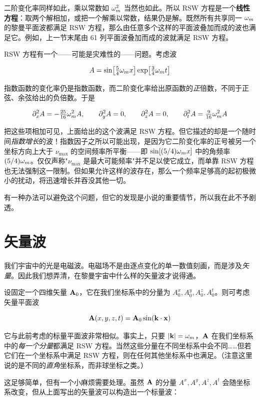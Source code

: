 二阶变化率同样如此，乘以常数如 $\omega_m^{2}$ 当然也如此。所以 RSW 方程是一个\textbf{线性方程}：取两个解相加，或把一个解乘以常数，结果仍是解。既然所有共享同一 $\omega_m$ 的黎曼平面波都满足 RSW 方程，那么由任意多个这样的平面波叠加而成的波也满足它。例如，上一节末尾由 61 列平面波叠加而成的波就满足 RSW 方程。

RSW 方程有一个——可能是灾难性的——问题。考虑波

\[
A=\sin\!\left[\tfrac{5}{4}\omega_m x\right]\exp\!\left[\tfrac{3}{4}\omega_m t\right]
\]

指数函数的变化率仍是指数函数，而二阶变化率给出原函数的\emph{正}倍数，不同于正弦、余弦给出的负倍数。于是

\[
\partial_{x}^{2}A=-\tfrac{25}{16}\omega_m^{2}A,\qquad \partial_{y}^{2}A=0,\qquad \partial_{z}^{2}A=0,\qquad \partial_{t}^{2}A=\tfrac{9}{16}\omega_m^{2}A
\]

把这些项相加可见，上面给出的这个波满足 RSW 方程。但它描述的却是一个随时间\emph{指数增长}的波！指数因子之所以可能出现，是因为它二阶变化率的正号被另一个坐标方向上大于 $\nu_{\max}$ 的空间频率所平衡——即 $\sin[(5/4)\omega_m x]$ 中的角频率 $(5/4)\omega_m$。仅仅声称"$\nu_{\max}$ 是最大可能频率"并不足以使它成立，而单靠 RSW 方程也无法强制这一限制。但如果允许这样的波存在，那么一个频率足够高的起初极微小的扰动，将迅速增长并吞没其他一切。

有一种办法可以避免这个问题，但它的发现是小说的重要情节，所以我在此不予剧透。

\section{矢量波}

我们宇宙中的光是电磁波。电磁场不是由逐点变化的单一数值刻画，而是涉及\emph{矢量}。因此我们想弄清，在黎曼宇宙中什么样的矢量波才说得通。

设固定一个四维矢量 $\mathbf{A}_{0}$，它在我们坐标系中的分量为 $A_{0}^{x},A_{0}^{y},A_{0}^{z},A_{0}^{t}$。则可考虑矢量平面波

\[
\mathbf{A}(x,y,z,t)=\mathbf{A}_{0}\sin(\mathbf{k}\cdot\mathbf{x})
\]

它与此前考虑的标量平面波非常相似。事实上，只要 $|\mathbf{k}|=\omega_m$，$\mathbf{A}$ 在我们坐标系中的\emph{每一个分量}都满足 RSW 方程。当然这些分量在不同坐标系中会不同……但若它们在一个坐标系中满足 RSW 方程，则在任何其他坐标系中也满足。（注意这里说的是不同的\emph{直角}坐标系，而非球坐标之类。）

这足够简单，但有一个小麻烦需要处理。虽然 $\mathbf{A}$ 的分量 $A^{x},A^{y},A^{z},A^{t}$ 会随坐标系改变，但从上面写出的矢量波可以构造出一个标量波：


